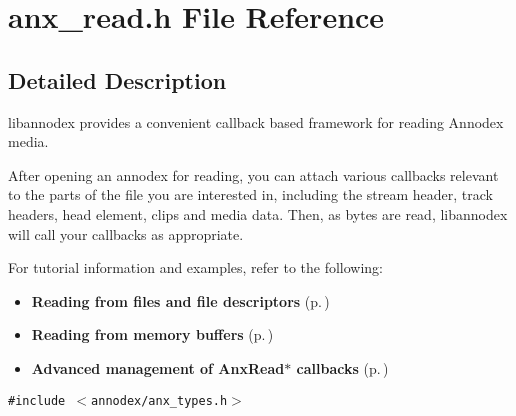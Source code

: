 \section{anx\_\-read.h File Reference}
\label{anx__read_8h}


\subsection{Detailed Description}
libannodex provides a convenient callback based framework for reading Annodex media. 

After opening an annodex for reading, you can attach various callbacks relevant to the parts of the file you are interested in, including the stream header, track headers, head element, clips and media data. Then, as bytes are read, libannodex will call your callbacks as appropriate.

For tutorial information and examples, refer to the following:

\begin{itemize}
\item {\bf Reading from files and file descriptors }{\rm (p.\,\pageref{group__reading__files})}\item {\bf Reading from memory buffers }{\rm (p.\,\pageref{group__reading__memory})}\item {\bf Advanced management of Anx\-Read$\ast$ callbacks }{\rm (p.\,\pageref{group__reading__callbacks})}\end{itemize}


{\tt \#include $<$annodex/anx\_\-types.h$>$}\par
